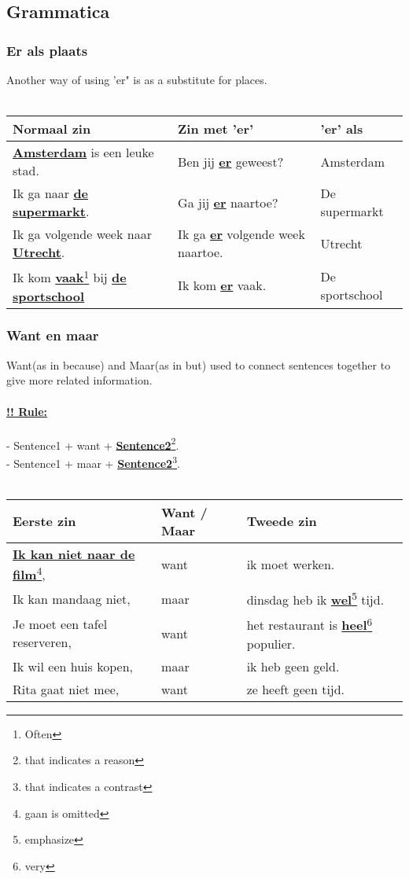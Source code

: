 \documentclass[a4paper,14pt]{extarticle}
\newcommand{\note}[2]{\underline{\textbf{#1}}\footnote{#2}}
\newcommand{\attention}[1]{\underline{\textbf{!! #1}}}
\newcommand{\emp}[1]{\underline{\textbf{#1}}}
\begin{document}
\subsection{Grammatica}
\subsubsection{Er als plaats}
Another way of using 'er" is as a substitute for places.\\ \\
\begin{tabularx}{\textwidth}{p{} p{} p{}}
    \hline
    \textbf{Normaal zin} & \textbf{Zin met 'er'} & \textbf{'er' als} \\
    \hline
   \emp{Amsterdam} is een leuke stad. & Ben jij \emp{er} geweest? & Amsterdam \\
   Ik ga naar \emp{de supermarkt}. & Ga jij \emp{er} naartoe? & De supermarkt \\
   Ik ga volgende week naar \emp{Utrecht}. & Ik ga \emp{er} volgende week naartoe. & Utrecht \\
   Ik kom \note{vaak}{Often} bij \emp{de sportschool} & Ik kom \emp{er} vaak. & De sportschool \\
\end{tabularx}
\newpage
\subsubsection{Want en maar}
Want(as in because) and Maar(as in but) used to connect sentences together to give more related information. \\ 
\hfill \\
\attention{Rule:} \\ \\
- Sentence1 + want + \note{Sentence2}{that indicates a reason}. \\
- Sentence1 + maar + \note{Sentence2}{that indicates a contrast}. \\ \\
\begin{tabularx}{\textwidth}{p{} >{\centering}p{} p{}}
    \hline
    \textbf{Eerste zin} & \textbf{Want / Maar} & \textbf{Tweede zin} \\
    \hline
    \note{Ik kan niet naar de film}{gaan is omitted}, & want & ik moet werken. \\
    Ik kan mandaag niet, & maar & dinsdag heb ik \note{wel}{emphasize} tijd. \\
    Je moet een tafel reserveren, & want & het restaurant is \note{heel}{very} populier. \\
    Ik wil een huis kopen, & maar & ik heb geen geld. \\
    Rita gaat niet mee, & want & ze heeft geen  tijd. \\
\end{tabularx}
\end{document}
